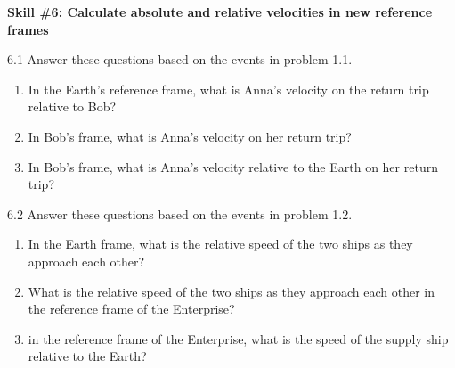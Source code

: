\pagebreak

\textbf{Skill \#6: Calculate absolute and relative velocities in new reference frames}

6.1 Answer these questions based on the events in problem 1.1.
\begin{enumerate}[nosep,label=(\emph{\alph*})]
\item In the Earth's reference frame, what is Anna's velocity on the return trip relative to Bob?
\answerspace{1.0in}

\item In Bob's frame, what is Anna's velocity on her return trip?
\answerspace{1.0in}

\item In Bob's frame, what is Anna's velocity relative to the Earth on her return trip?
\answerspace{1.0in}

\end{enumerate}

6.2 Answer these questions based on the events in problem 1.2.
\begin{enumerate}[nosep,label=(\emph{\alph*})]
\item In the Earth frame, what is the relative speed of the two ships as they approach each other?
\answerspace{1.0in}

\item What is the relative speed of the two ships as they approach each other in the reference frame of the Enterprise?
\answerspace{1.0in}

\item in the reference frame of the Enterprise, what is the speed of the supply ship relative to the Earth?
\answerspace{1.0in}
\end{enumerate}

